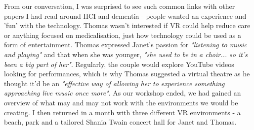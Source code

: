 From our conversation, I was surprised to see such common links with other papers I had read around HCI and dementia - people wanted an experience and 'fun' with the technology. Thomas wasn't interested if VR could help reduce care or anything focused on medicalisation, just how technology could be used as a form of entertainment. Thomas expressed Janet's passion for \textit{"listening to music and playing"} and that when she was younger, \textit{"she used to be in a choir... so it's been a big part of her"}. Regularly, the couple would explore YouTube videos looking for performances, which is why Thomas suggested a virtual theatre as he thought it'd be an \textit{"effective way of allowing her to experience something approaching live music once more"}. As our workshop ended, we had gained an overview of what may and may not work with the environments we would be creating. I then returned in a month with three different VR environments - a beach, park and a tailored Shania Twain concert hall for Janet and Thomas.
 
